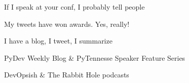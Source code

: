 \documentclass[letterpaper]{deedy-resume} %
\begin{document}
\begin{minipage}[t]{0.66\textwidth}
\sectionspace %


\begin{tightitemize}
\item If I speak at your conf, I probably tell people
\item My tweets have won awards. Yes, really!
\end{tightitemize}

\sectionspace %


\begin{tightitemize}
\item I have a blog, I tweet, I summarize 
\end{tightitemize}

\sectionspace %


\begin{tightitemize}
\item PyDev Weekly Blog \& PyTennesse Speaker Feature Series
\item DevOpsish \& The Rabbit Hole podcasts
\end{tightitemize}


\end{minipage}
\end{document}

